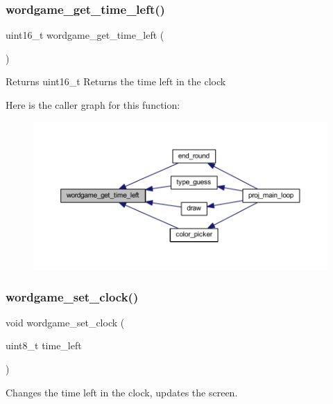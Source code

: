 \subsubsection{\texorpdfstring{wordgame\+\_\+get\+\_\+time\+\_\+left()}{wordgame\_get\_time\_left()}}
{\footnotesize\ttfamily uint16\+\_\+t wordgame\+\_\+get\+\_\+time\+\_\+left (\begin{DoxyParamCaption}{ }\end{DoxyParamCaption})}

\begin{DoxyReturn}{Returns}
uint16\+\_\+t Returns the time left in the clock 
\end{DoxyReturn}
Here is the caller graph for this function\+:\nopagebreak
\begin{figure}[H]
\begin{center}
\leavevmode
\includegraphics[width=350pt]{group__wordpicker_ga331045a68738d98e1553c33ea143720b_icgraph}
\end{center}
\end{figure}
\mbox{\label{group__wordpicker_ga7984076dba84531d5c4e5e96ca7b177d}} 
\subsubsection{\texorpdfstring{wordgame\+\_\+set\+\_\+clock()}{wordgame\_set\_clock()}}
{\footnotesize\ttfamily void wordgame\+\_\+set\+\_\+clock (\begin{DoxyParamCaption}\item[{uint8\+\_\+t}]{time\+\_\+left }\end{DoxyParamCaption})}



Changes the time left in the clock, updates the screen. 


